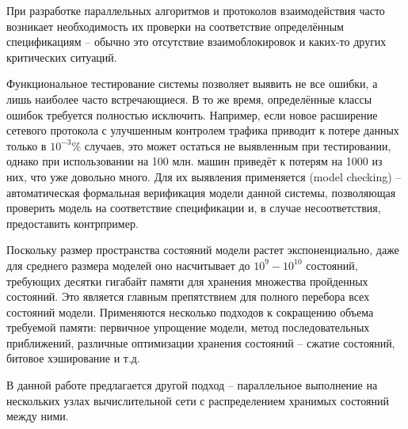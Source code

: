 \Introduction

При разработке параллельных алгоритмов и протоколов взаимодействия часто возникает
необходимость их проверки на соответствие определённым спецификациям -- обычно это
отсутствие взаимоблокировок и каких-то других критических ситуаций.

Функциональное тестирование системы позволяет выявить не все ошибки, а лишь наиболее часто
встречающиеся. В то же время, определённые классы ошибок требуется полностью
исключить. Например, если новое расширение сетевого протокола с улучшенным контролем
трафика приводит к потере данных только в $10^{-3}\%$ случаев, это может остаться не
выявленным при тестировании, однако при использовании на 100 млн. машин приведёт к потерям
на 1000 из них, что уже довольно много. Для их выявления применяется 
(model checking) -- автоматическая формальная верификация модели данной системы,
позволяющая проверить модель на соответствие спецификации и, в случае несоответствия,
предоставить контрпример.

Поскольку размер пространства состояний модели растет экспоненциально, даже для среднего
размера моделей оно насчитывает до $10^9 - 10^{10}$ состояний, требующих десятки гигабайт
памяти для хранения множества пройденных состояний. Это является главным препятствием для
полного перебора всех состояний модели. Применяются несколько подходов к сокращению объема
требуемой памяти: первичное упрощение модели, метод последовательных приближений,
различные оптимизации хранения состояний -- сжатие состояний, битовое хэширование и т.д. 

В данной работе предлагается другой подход -- параллельное выполнение на нескольких узлах
вычислительной сети с распределением хранимых состояний между ними.

